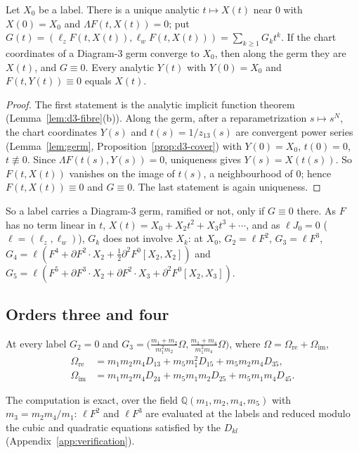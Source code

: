 \begin{lemma}\label{lem:d3-graph}
Let $X_0$ be a label.  There is a unique analytic $t\mapsto X(t)$ near $0$ with $X(0)=X_0$ and
$\Lambda F(t,X(t))=0$; put $G(t)=(\ell_zF(t,X(t)),\ell_wF(t,X(t)))=\sum_{k\ge1}G_kt^k$.  If the
chart coordinates of a Diagram-3 germ converge to $X_0$, then along the germ they are $X(t)$, and
$G\equiv0$.  Every analytic $Y(t)$ with $Y(0)=X_0$ and $F(t,Y(t))\equiv0$ equals $X(t)$.
\end{lemma}

\begin{proof}
The first statement is the analytic implicit function theorem (Lemma~\ref{lem:d3-fibre}(b)).
Along the germ, after a reparametrization $s\mapsto s^N$, the chart coordinates $Y(s)$ and
$t(s)=1/z_{13}(s)$ are convergent power series (Lemma~\ref{lem:germ},
Proposition~\ref{prop:d3-cover}) with $Y(0)=X_0$, $t(0)=0$, $t\not\equiv0$.  Since
$\Lambda F(t(s),Y(s))=0$, uniqueness gives $Y(s)=X(t(s))$.  So $F(t,X(t))$ vanishes on the image
of $t(s)$, a neighbourhood of $0$; hence $F(t,X(t))\equiv0$ and $G\equiv0$.  The last statement is
again uniqueness.
\end{proof}

So a label carries a Diagram-3 germ, ramified or not, only if $G\equiv0$ there.  As $F$ has no
term linear in $t$, $X(t)=X_0+X_2t^2+X_3t^3+\cdots$, and as $\ell J_0=0$ ($\ell=(\ell_z,\ell_w)$),
$G_k$ does not involve $X_k$: at $X_0$, $G_2=\ell F^2$, $G_3=\ell F^3$,
$G_4=\ell(F^4+\partial F^2\cdot X_2+\tfrac12\partial^2F^0[X_2,X_2])$ and
$G_5=\ell(F^5+\partial F^3\cdot X_2+\partial F^2\cdot X_3+\partial^2F^0[X_2,X_3])$.

\subsection{Orders three and four}

\begin{lemma}\label{lem:d3-order3}
At every label $G_2=0$ and
$G_3=\bigl(\frac{m_1+m_2}{m_1^2m_2}\Omega,\frac{m_1+m_4}{m_1^2m_4}\Omega\bigr)$, where
$\Omega=\Omega_{\mathrm{re}}+\Omega_{\mathrm{im}}$,
\[
\begin{aligned}
\Omega_{\mathrm{re}}&=m_1m_2m_4D_{13}+m_5m_1^2D_{15}+m_5m_2m_4D_{35},\\
\Omega_{\mathrm{im}}&=m_1m_2m_4D_{24}+m_5m_1m_2D_{25}+m_5m_1m_4D_{45}.
\end{aligned}
\]
\end{lemma}

The computation is exact, over the field $\mathbb Q(m_1,m_2,m_4,m_5)$ with $m_3=m_2m_4/m_1$:
$\ell F^2$ and $\ell F^3$ are evaluated at the labels and reduced modulo the cubic and quadratic
equations satisfied by the $D_{kl}$ (Appendix~\ref{app:verification}).

